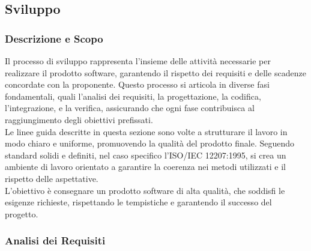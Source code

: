 \documentclass[10pt]{article}
\begin{document}
\begin{justify}
    \subsection{Sviluppo}

    \subsubsection{Descrizione e Scopo}
    Il processo di sviluppo rappresenta l’insieme delle attività necessarie per realizzare il prodotto software, garantendo il rispetto dei requisiti e delle scadenze concordate con la proponente. Questo processo si articola in diverse fasi fondamentali, quali l'analisi dei requisiti, la progettazione, la codifica, l'integrazione, e la verifica, assicurando che ogni fase contribuisca al raggiungimento degli obiettivi prefissati.\\
    Le linee guida descritte in questa sezione sono volte a strutturare il lavoro in modo chiaro e uniforme, promuovendo la qualità del prodotto finale. Seguendo standard solidi e definiti, nel caso specifico l'ISO/IEC 12207:1995, si crea un ambiente di lavoro orientato a garantire la coerenza nei metodi utilizzati e il rispetto delle aspettative.\\
    L'obiettivo è consegnare un prodotto software di alta qualità, che soddisfi le esigenze richieste, rispettando le tempistiche e garantendo il successo del progetto.\\

    \subsubsection{Analisi dei Requisiti}

\end{justify}
\end{document}
